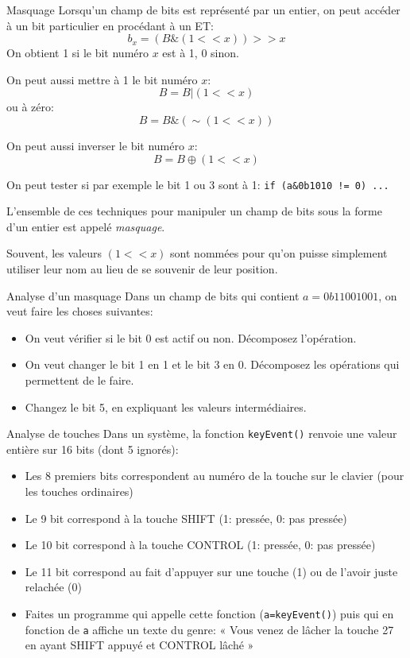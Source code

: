 \begin{frame}{Masquage}
  Lorsqu'un champ de bits est représenté par un entier, on peut accéder à un bit particulier en procédant à un ET:
  $$b_x=(B\&(1<<x))>>x$$
  On obtient 1 si le bit numéro $x$ est à 1, 0 sinon.
  
  On peut aussi mettre à 1 le bit numéro $x$:
  $$B=B|(1<<x)$$
  ou à zéro:
  $$B=B\&(\sim(1<<x))$$

  On peut aussi inverser le bit numéro $x$:
  $$B=B\oplus(1<<x)$$

  On peut tester si par exemple le bit 1 ou 3 sont à 1:
  \texttt{if (a\&0b1010 != 0) ...}

  L'ensemble de ces techniques pour manipuler un champ de bits sous la
  forme d'un entier est appelé \emph{masquage}.
  
  Souvent, les valeurs $(1<<x)$ sont nommées pour qu'on puisse
  simplement utiliser leur nom au lieu de se souvenir de leur position.
\end{frame}
\begin{exercice}
  \begin{exercicelet}{Analyse d'un masquage}
    Dans un champ de bits qui contient $a=0b11001001$, on veut faire les choses suivantes:
    \begin{itemize}
    \item On veut vérifier si le bit 0 est actif ou non. Décomposez
      l'opération.
    \item On veut changer le bit 1 en 1 et le bit 3 en 0. Décomposez les
      opérations qui permettent de le faire.
    \item Changez le bit 5, en expliquant les valeurs intermédiaires.
    \end{itemize}
  \end{exercicelet}
  \begin{exercicelet}{Analyse de touches}
    Dans un système, la fonction \texttt{keyEvent()} renvoie une valeur entière sur 16 bits (dont 5 ignorés):
    \begin{itemize}
    \item Les 8 premiers bits correspondent au numéro de la touche sur le clavier (pour les touches ordinaires)
    \item Le 9\ieme{} bit correspond à la touche SHIFT (1: pressée, 0: pas pressée)
    \item Le 10\ieme{} bit correspond à la touche CONTROL (1: pressée, 0: pas pressée)
    \item Le 11\ieme{} bit correspond au fait d'appuyer sur une touche (1) ou de l'avoir juste relachée (0)
    \end{itemize}
    \begin{itemize}
    \item[\ddialoghome] Faites un programme qui appelle cette fonction
      (\texttt{a=keyEvent()}) puis qui en fonction de \texttt{a} affiche
      un texte du genre: « Vous venez de lâcher la touche 27 en ayant
      SHIFT appuyé et CONTROL lâché »
    \end{itemize}
  \end{exercicelet}
\end{exercice}
